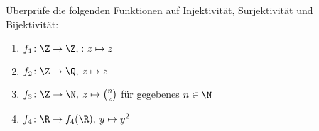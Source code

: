 \begin{exercise}
  Überprüfe die folgenden Funktionen auf Injektivität, Surjektivität und
  Bijektivität:
  \begin{enumerate}
  \item \(f_{1} \colon \Z \to \Z, \colon z \mapsto z\)
  \item \(f_{2} \colon \Z \to \Q, \: z \mapsto z\)
  \item \(f_{3}\colon \Z \to \N, \: z \mapsto \binom{n}{z}\) für gegebenes
    \(n \in \N\)
  \item \(f_{4}\colon \R \to f_{4}(\R), \: y \mapsto y^{2}\)
  \end{enumerate}
\end{exercise}
